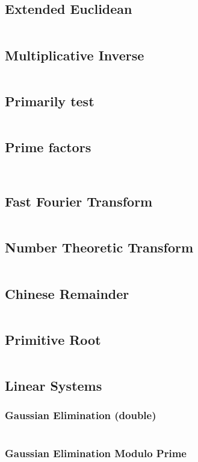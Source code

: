 \documentclass[a4paper, 10pt, twocolumn, landscape]{article}
\begin{document}
  \subsection{Extended Euclidean}
  \inputminted{cpp}{math/extended-euclid.cpp}
  \subsection{Multiplicative Inverse}
  \inputminted{cpp}{math/mult-inverse.cpp}
  \subsection{Primarily test}
  \inputminted{cpp}{math/miller-rabin.cpp}
  \subsection{Prime factors}
  \inputminted{cpp}{math/prime-factors.cpp}
  \inputminted{cpp}{math/pollard-rho.cpp}
  \subsection{Fast Fourier Transform}
  \inputminted{cpp}{math/fft.cpp}
  \subsection{Number Theoretic Transform}
  \inputminted{cpp}{math/ntt.cpp}
  \subsection{Chinese Remainder}
  \inputminted{cpp}{math/chinese.cpp}
  \subsection{Primitive Root}
  \inputminted{cpp}{math/primitive-root.cpp}
  \subsection{Linear Systems}
  \subsubsection{Gaussian Elimination (double)}
  \inputminted{cpp}{math/gauss-elim.cpp}
  \subsubsection{Gaussian Elimination Modulo Prime}
  \inputminted{cpp}{math/gauss-elim-prime.cpp}
\end{document}

